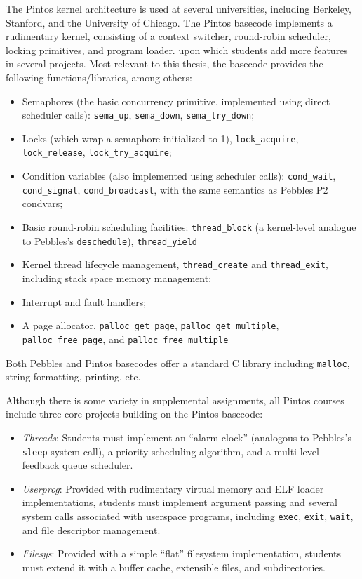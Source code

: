 The Pintos kernel architecture \cite{pintos} is used at several universities, including Berkeley, Stanford, and the University of Chicago.
The Pintos basecode implements a rudimentary kernel, consisting of a context switcher, round-robin scheduler, locking primitives, and program loader.
upon which students add more features in several projects.
Most relevant to this thesis, the basecode provides the following functions/libraries, among others:
\begin{itemize}
	\item Semaphores (the basic concurrency primitive, implemented using direct scheduler calls): {\tt sema\_up}, {\tt sema\_down}, {\tt sema\_try\_down};
	\item Locks (which wrap a semaphore initialized to 1), {\tt lock\_acquire}, {\tt lock\_\allowbreak{}release}, {\tt lock\_try\_acquire};
	\item Condition variables (also implemented using scheduler calls): {\tt cond\_wait}, {\tt cond\_\allowbreak{}signal}, {\tt cond\_broadcast}, with the same semantics as Pebbles P2 condvars;
	\item Basic round-robin scheduling facilities: {\tt thread\_block} (a kernel-level analogue to Pebbles's {\tt deschedule}), {\tt thread\_yield}
	\item Kernel thread lifecycle management, {\tt thread\_create} and {\tt thread\_exit}, including stack space memory management;
	\item Interrupt and fault handlers;
	\item A page allocator, {\tt palloc\_get\_page}, {\tt palloc\_get\_multiple}, {\tt palloc\_free\_page}, and {\tt palloc\_free\_multiple}
\end{itemize}
Both Pebbles and Pintos basecodes offer a standard C library including {\tt malloc}, string-formatting, printing, etc.

Although there is some variety in supplemental assignments, all Pintos courses include three core projects building on the Pintos basecode:
\begin{itemize}
	\item {\em Threads}: Students must implement an ``alarm clock'' (analogous to Pebbles's {\tt sleep} system call),
		a priority scheduling algorithm, and a multi-level feedback queue scheduler.
	\item {\em Userprog}: Provided with rudimentary virtual memory and ELF loader implementations, students must implement argument passing and several system calls associated with userspace programs, including {\tt exec}, {\tt exit}, {\tt wait}, and file descriptor management.
	\item {\em Filesys}: Provided with a simple ``flat'' filesystem implementation, students must extend it with a buffer cache, extensible files, and subdirectories.
\end{itemize}

